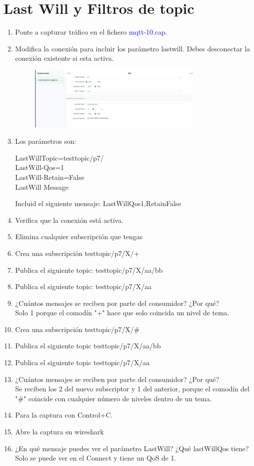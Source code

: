 \documentclass[12pt, a4paper]{report}
\begin{document}
\chapter{Last Will y Filtros de topic}
\begin{enumerate}
	\item Ponte a capturar tráfico en el fichero \textcolor{blue}{mqtt-10.cap}.
	\item Modifica la conexión para incluir los parámetro lastwill. Debes desconectar la conexión existente
	si esta activa.
	\begin{figure}[H]
		\centering
		\includegraphics[width=0.8\textwidth]{enun19}
	\end{figure}
	\item Los parámetros son:
	\begin{flushleft}
		LastWillTopic=testtopic/p7/\\
		LastWill-Qos=1\\
		LastWill-Retain=False\\
		LastWill Message
	\end{flushleft}
	Incluid el siguiente mensaje: LastWillQos1,RetainFalse
	\item Verifica que la conexión está activa.
	\item Elimina cualquier subscripción que tengas
	\item Crea una subscripción testtopic/p7/X/+
	\item Publica el siguiente topic: testtopic/p7/X/aa/bb
	\item Publica el siguiente topic: testtopic/p7/X/aa
	\item ¿Cuántos mensajes se reciben por parte del consumidor? ¿Por qué?\\
	
	Solo 1 porque el comodín "+" hace que solo coincida un nivel de tema.
	\item Crea una subscripción testtopic/p7/X/\#
	\item Publica el siguiente topic testtopic/p7/X/aa/bb
	\item Publica el siguiente topic testtopic/p7/X/aa
	\item ¿Cuántos mensajes se reciben por parte del consumidor? ¿Por qué?\\
	
	Se reciben los 2 del nuevo subscriptor y 1 del anterior, porque el comodín del "\#" coincide con cualquier número de niveles dentro de un tema.
	\item Para la captura con Control+C.
	\item Abre la captura en wireshark
	\item ¿En qué mensaje puedes ver el parámetro LastWill? ¿Qué lastWillQos tiene?\\
	
	Solo se puede ver en el Connect y tiene un QoS de 1.
\end{enumerate}
\end{document}
